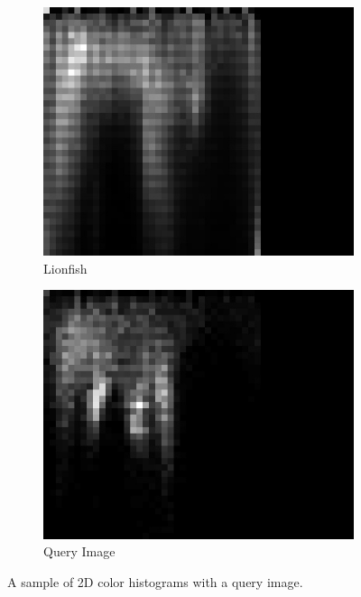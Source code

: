 \documentclass[10pt,twocolumn,letterpaper]{article}
\begin{document}
\begin{figure}[ht]
\begin{center}
\begin{subfigure}[b]{0.24\linewidth}
		\includegraphics[width=\textwidth]{PointyFish_hist.jpg}
		\caption{Lionfish}
	\end{subfigure}
	\begin{subfigure}[b]{0.24\linewidth}
		\includegraphics[width=\textwidth]{current_hist.jpg}
		\caption{Query Image}
	\end{subfigure}

\end{center}
\caption{\small A sample of 2D color histograms with a query image.}
\label{fig:colorHists}
\end{figure}
\end{document}
